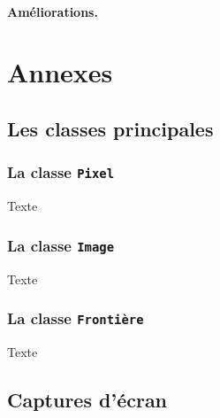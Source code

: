 \documentclass[12pt]{article}
\begin{document}
\paragraph{Améliorations.}



\newpage
{}

\printbibliography




\newpage
\appendix
\section*{Annexes}
\label{sec:annexes}

\subsection*{Les classes principales}\label{les-classes}

\subsubsection*{La classe \texttt{Pixel}}

Texte

\subsubsection*{La classe \texttt{Image}}

Texte

\subsubsection*{La classe \texttt{Frontière}}

Texte

\subsection*{Captures d'écran}
\label{sub:images}
\end{document}
